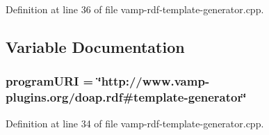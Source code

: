 Definition at line 36 of file vamp-\/rdf-\/template-\/generator.\+cpp.



\subsection{Variable Documentation}
\subsubsection[{\texorpdfstring{program\+U\+RI}{programURI}}]{ program\+U\+RI = \char`\"{}http\+://www.\+vamp-\/plugins.\+org/doap.\+rdf\#template-\/generator\char`\"{}}\hypertarget{vamp-rdf-template-generator_8cpp_ae18b054ee657b919f1028fd8843cf383}{}\label{vamp-rdf-template-generator_8cpp_ae18b054ee657b919f1028fd8843cf383}


Definition at line 34 of file vamp-\/rdf-\/template-\/generator.\+cpp.

